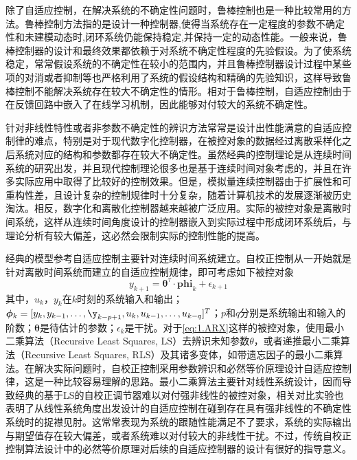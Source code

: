 除了自适应控制，在解决系统的不确定性问题时，鲁棒控制也是一种比较常用的方法。鲁棒控制方法指的是设计一种控制器,使得当系统存在一定程度的参数不确定性和未建模动态时,闭环系统仍能保持稳定,并保持一定的动态性能。一般来说，鲁棒控制器的设计和最终效果都依赖于对系统不确定性程度的先验假设。为了使系统稳定，常常假设系统的不确定性在较小的范围内，并且鲁棒控制器设计过程中某些项的对消或者抑制等也严格利用了系统的假设结构和精确的先验知识，这样导致鲁棒控制不能解决系统存在较大不确定性的情形。相对于鲁棒控制，自适应控制由于在反馈回路中嵌入了在线学习机制，因此能够对付较大的系统不确定性。

针对非线性特性或者非参数不确定性的辨识方法常常是设计出性能满意的自适应控制律的难点，特别是对于现代数字化控制器，在被控对象的数据经过离散采样化之后系统对应的结构和参数都存在较大不确定性。虽然经典的控制理论是从连续时间系统的研究出发，并且现代控制理论很多也是基于连续时间对象考虑的，并且在许多实际应用中取得了比较好的控制效果。但是，模拟量连续控制器由于扩展性和可重构性差，且设计复杂的控制规律时十分复杂，随着计算机技术的发展逐渐被历史淘汰。相反，数字化和离散化控制器越来越被广泛应用。实际的被控对象是离散时间系统，这样从连续时间角度设计的控制器嵌入到实际过程中形成闭环系统后，与理论分析有较大偏差，这必然会限制实际的控制性能的提高。

经典的模型参考自适应控制主要针对连续时间系统建立。自校正控制从一开始就是针对离散时间系统而建立的自适应控制规律，即可考虑如下被控对象
\begin{equation}%
\label{eq:1.ARX}
y_{k+1} = \bm{\theta}^{\tau}\cdot\bm{phi}_{k} + \epsilon_{k+1}
\end{equation}
其中，$u_{k}$，$y_{k}$在$k$时刻的系统输入和输出；$\bm{\phi}_{k} = [y_{k},y_{k-1},\ldots,\y_{k-p+1},u_{k},u_{k-1},\ldots,u_{k-q}]^{T}$；$p$和$q$分别是系统输出和输入的阶数；$\bm{\theta}$是待估计的参数；$\epsilon_{k}$是干扰。对于\eqref{eq:1.ARX}这样的被控对象，使用最小二乘算法（Recursive Least Squares, LS）去辨识未知参数$\theta$，或者递推最小二乘算法（Recursive Least Squares, RLS）及其诸多变体，如带遗忘因子的最小二乘算法。在解决实际问题时，自校正控制采用参数辨识和必然等价原理设计自适应控制律，这是一种比较容易理解的思路。最小二乘算法主要针对线性系统设计，因而导致经典的基于LS的自校正调节器难以对付强非线性的被控对象，相关对比实验也表明了从线性系统角度出发设计的自适应控制在碰到存在具有强非线性的不确定性系统时的捉襟见肘。这常常表现为系统的跟随性能满足不了要求，系统的实际输出与期望值存在较大偏差，或者系统难以对付较大的非线性干扰。不过，传统自校正控制算法设计中的必然等价原理对后续的自适应控制器的设计有很好的指导意义。

